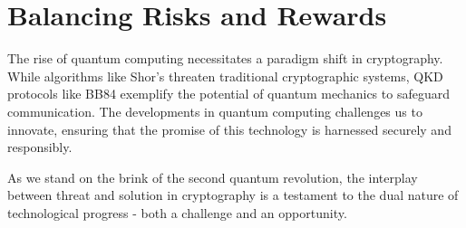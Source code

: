 \documentclass{article}
\begin{document}
\section*{Balancing Risks and Rewards}
The rise of quantum computing necessitates a paradigm shift in cryptography. While algorithms like Shor’s threaten traditional cryptographic systems, QKD protocols like BB84 exemplify the potential of quantum mechanics to safeguard communication. The developments in quantum computing challenges us to innovate, ensuring that the promise of this technology is harnessed securely and responsibly.

As we stand on the brink of the second quantum revolution, the interplay between threat and solution in cryptography is a testament to the dual nature of technological progress - both a challenge and an opportunity.
\end{document}
